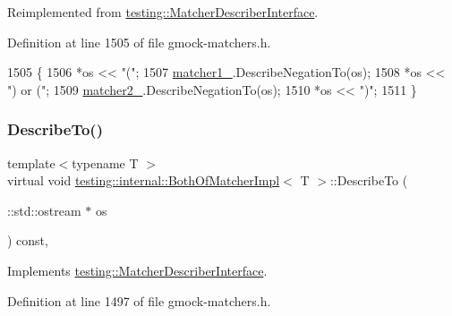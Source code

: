 Reimplemented from \hyperlink{classtesting_1_1MatcherDescriberInterface_a2071afbc47097c4d1c0064275af34db0}{testing\+::\+Matcher\+Describer\+Interface}.



Definition at line 1505 of file gmock-\/matchers.\+h.


\begin{DoxyCode}
1505                                                         \{
1506     *os << \textcolor{stringliteral}{"("};
1507     \hyperlink{classtesting_1_1internal_1_1BothOfMatcherImpl_a31f8739f880776e209a3e5bd96ddfbf6}{matcher1\_}.DescribeNegationTo(os);
1508     *os << \textcolor{stringliteral}{") or ("};
1509     \hyperlink{classtesting_1_1internal_1_1BothOfMatcherImpl_aeb19d68ac4732ad2ca45a9d37ad955cb}{matcher2\_}.DescribeNegationTo(os);
1510     *os << \textcolor{stringliteral}{")"};
1511   \}
\end{DoxyCode}
\mbox{\label{classtesting_1_1internal_1_1BothOfMatcherImpl_a3a1f92f7b093d36ab38c35fbcae4ce4d}} 
\subsubsection{\texorpdfstring{Describe\+To()}{DescribeTo()}}
{\footnotesize\ttfamily template$<$typename T $>$ \\
virtual void \hyperlink{classtesting_1_1internal_1_1BothOfMatcherImpl}{testing\+::internal\+::\+Both\+Of\+Matcher\+Impl}$<$ T $>$\+::Describe\+To (\begin{DoxyParamCaption}\item[{\+::std\+::ostream $\ast$}]{os }\end{DoxyParamCaption}) const\hspace{0.3cm}{\ttfamily [inline]}, {\ttfamily [virtual]}}



Implements \hyperlink{classtesting_1_1MatcherDescriberInterface_ad9f861588bd969b6e3e717f13bb94e7b}{testing\+::\+Matcher\+Describer\+Interface}.



Definition at line 1497 of file gmock-\/matchers.\+h.


